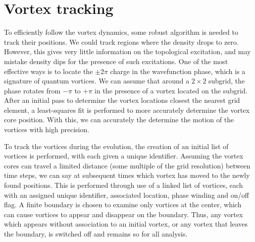  \section{Vortex tracking}
 To efficiently follow the vortex dynamics, some robust algorithm is needed to track their positions. We could track regions where the density drops to zero. However, this gives very little information on the topological excitation, and may mistake density dips for the presence of such excitations. One of the most effective ways is to locate the $\pm 2\pi$ charge in the wavefunction phase, which is a signature of quantum vortices. We can assume that around a $2\times 2$ subgrid, the phase rotates from $-\pi$ to $+\pi$ in the presence of a vortex located on the subgrid. After an initial pass to determine the vortex locations closest the nearest grid element, a least-squares fit is performed to more accurately determine the vortex core position. With this, we can accurately the determine the motion of the vortices with high precision.

 To track the vortices during the evolution, the creation of an initial list of vortices is performed, with each given a unique identifier. Assuming the vortex cores can travel a limited distance (some multiple of the grid resolution) between time steps, we can say at subsequent times which vortex has moved to the newly found positions. This is performed through use of a linked list of vortices, each with an assigned unique identifier, associated location, phase winding and on/off flag. A finite boundary is chosen to examine only vortices at the center, which can cause vortices to appear and disappear on the boundary. Thus, any vortex which appears without association to an initial vortex, or any vortex that leaves the boundary, is switched off and remains so for all analysis.
